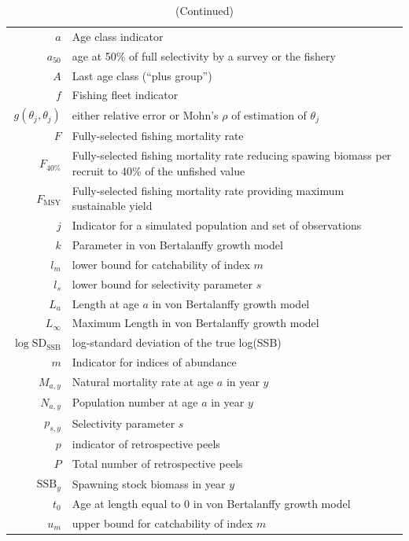 \begin{longtable}[c]{r p{}}
\caption{Definition of terms.\label{symbols}}%
\\ \hline \hline \endfirsthead 
\caption[]{(Continued)} %
\\ \hline \hline \endhead
 \hline \hline \endfoot
$a$ & Age class indicator\\
$a_{50}$ & age at 50\% of full selectivity by a survey or the fishery\\
$A$ & Last age class (``plus group'')\\
$f$ & Fishing fleet indicator\\
$g(\theta_j, \theta_j)$ & either relative error or Mohn's $\rho$ of estimation of $\theta_j$\\
$F$ & Fully-selected fishing mortality rate\\
$F_{40\%}$ & Fully-selected fishing mortality rate reducing spawing biomass per recruit to 40\% of the unfished value\\
$F_{\text{MSY}}$ & Fully-selected fishing mortality rate providing maximum sustainable yield\\
$j$ & Indicator for a simulated population and set of observations\\
$k$ & Parameter in von Bertalanffy growth model\\
$l_m$ & lower bound for catchability of index $m$\\
$l_s$ & lower bound for selectivity parameter $s$\\
$L_a$ & Length at age $a$ in von Bertalanffy growth model\\
$L_\infty$ & Maximum Length in von Bertalanffy growth model\\
$\log\text{SD}_{\text{SSB}}$ & log-standard deviation of the true log(SSB)\\
$m$ & Indicator for indices of abundance\\
$M_{a,y}$ & Natural mortality rate at age $a$ in year $y$\\
$N_{a,y}$ & Population number at age $a$ in year $y$\\
$p_{s,y}$ & Selectivity parameter $s$\\
$p$ & indicator of retrospective peels\\
$P$ & Total number of retrospective peels\\
$\text{SSB}_{y}$ & Spawning stock biomass in year $y$\\
$t_0$ & Age at length equal to 0 in von Bertalanffy growth model\\
$u_m$ & upper bound for catchability of index $m$\\

\end{longtable}
